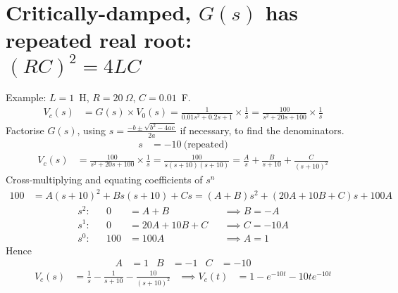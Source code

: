 \documentclass[a4paper,12pt]{article}
\begin{document}
\newpage
\section*{Critically-damped, $G(s)$ has repeated real root:\\$(RC)^2=4LC $}
Example: $L=1$~H, $R=20~\Omega$, $C=0.01$~F. %
\begin{align*}
  V_c(s) &= G(s) \times V_0(s)
  = \frac{1}{0.01 s^2 + 0.2 s + 1} \times \frac{1}{s}
  = \frac{100}{s^2 + 20 s + 100} \times \frac{1}{s}
\end{align*}
Factorise $G(s)$, using $s = \frac{-b\pm\sqrt{b^2-4ac}}{2a}$ if necessary, to find the denominators.
\begin{align*}
  s &= -10~\text{(repeated)}
\end{align*}
\begin{align*}
  V_c(s) &= \frac{100}{s^2 + 20 s + 100} \times \frac{1}{s}
  = \frac{100}{s(s+10)(s+10)}
  = \frac{A}{s} + \frac{B}{s+10} + \frac{C}{(s+10)^2}
\end{align*}
Cross-multiplying and equating coefficients of $s^n$
\begin{align*}
  100 &= A(s+10)^2 + Bs(s+10) + Cs = (A+B)s^2 + (20A+10B+C)s + 100A
\end{align*}
\begin{align*}
  s^2: && 0 &= A+B  &&\implies B = -A\\
  s^1: && 0 &= 20A+10B+C &&\implies C = -10A\\
  s^0: && 100 &= 100 A && \implies A = 1
\end{align*}
Hence
\begin{align*}
  A &= 1 & B &= -1 & C &= -10
\end{align*}
\begin{align*}
  V_c(s) &= \frac{1}{s} - \frac{1}{s+10} - \frac{10}{(s+10)^2} &\implies
  V_c(t) &= 1 - e^{-10t} -10te^{-10t}
\end{align*}
\newpage
\end{document}

